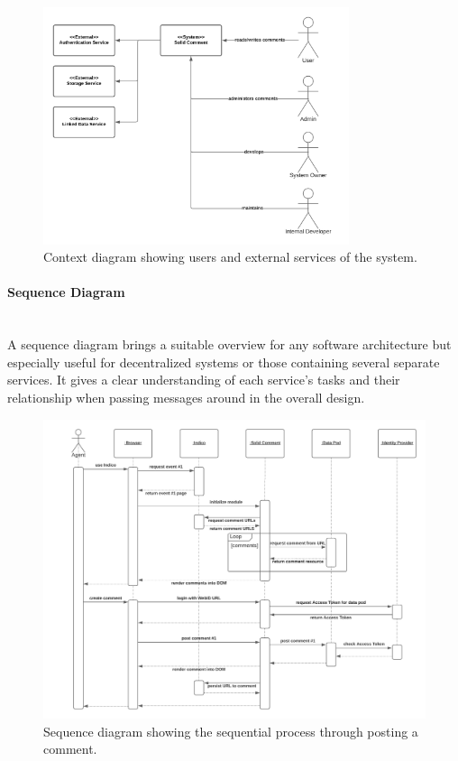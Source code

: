 \begin{figure}[H]
    \centering
    \includegraphics[width=0.8\textwidth]{prototype/graphs/poc-comment-context_diagram.png}
    \caption{Context diagram showing users and external services of the system.}
    \label{fig:poc-comment-context_diagram}
\end{figure}
\vspace{0.5cm}
\paragraph{Sequence Diagram}\mbox{}\\

A sequence diagram brings a suitable overview for any software architecture but especially useful for decentralized systems or those containing several separate services. It gives a clear understanding of each service’s tasks and their relationship when passing messages around in the overall design.

\begin{figure}[H]
    \centering
    \includegraphics[width=\textwidth]{prototype/graphs/poc-comment-sequence_diagram.png}
    \caption{Sequence diagram showing the sequential process through posting a comment.}
    \label{fig:poc-comment-sequence_diagram}
\end{figure}
\vspace{0.5cm}
